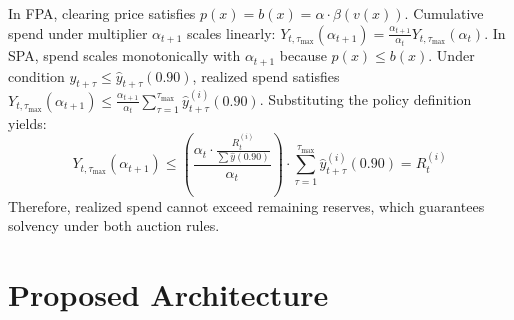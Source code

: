 \documentclass[sigconf]{acmart}
\begin{document}
In FPA, clearing price satisfies $p(x) = b(x) = \alpha \cdot \beta(v(x))$. Cumulative spend under multiplier $\alpha_{t+1}$ scales linearly: $Y_{t, \tau_{\max}}(\alpha_{t+1}) = \frac{\alpha_{t+1}}{\alpha_t} Y_{t, \tau_{\max}}(\alpha_t)$. In SPA, spend scales monotonically with $\alpha_{t+1}$ because $p(x) \le b(x)$. Under condition $y_{t+\tau} \le \hat{y}_{t+\tau}(0.90)$, realized spend satisfies $Y_{t, \tau_{\max}}(\alpha_{t+1}) \le \frac{\alpha_{t+1}}{\alpha_t} \sum_{\tau=1}^{\tau_{\max}} \hat{y}_{t+\tau}^{(i)}(0.90)$. Substituting the policy definition yields:
\begin{equation}
    Y_{t, \tau_{\max}}(\alpha_{t+1}) \le \left(\frac{\alpha_t \cdot \frac{R_t^{(i)}}{\sum \hat{y}(0.90)}}{\alpha_t}\right) \cdot \sum_{\tau=1}^{\tau_{\max}} \hat{y}_{t+\tau}^{(i)}(0.90) = R_t^{(i)}
\end{equation}
Therefore, realized spend cannot exceed remaining reserves, which guarantees solvency under both auction rules.

\section{Proposed Architecture}
\end{document}
